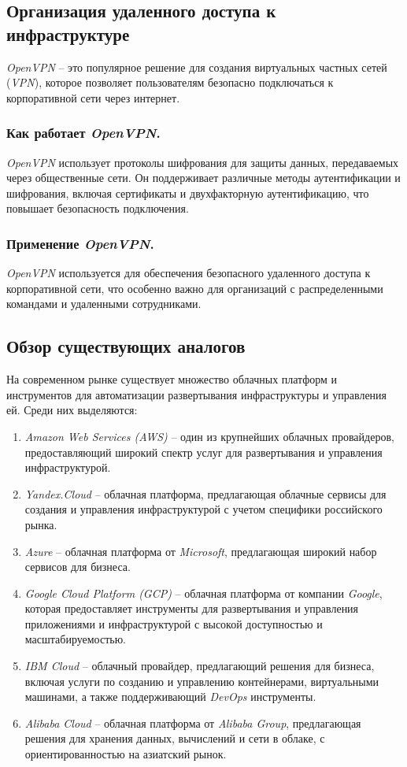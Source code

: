 \subsection{Организация удаленного доступа к инфраструктуре}
\label{sec:vpn}
\textit{OpenVPN} -- это популярное решение для создания виртуальных частных сетей (\textit{VPN}), которое позволяет пользователям безопасно подключаться к корпоративной сети через интернет.

\subsubsection{Как работает \textit{OpenVPN}.}
\textit{OpenVPN} использует протоколы шифрования для защиты данных, передаваемых через общественные сети. Он поддерживает различные методы аутентификации и шифрования, включая сертификаты и двухфакторную аутентификацию, что повышает безопасность подключения.

\subsubsection{Применение \textit{OpenVPN}.}
\textit{OpenVPN} используется для обеспечения безопасного удаленного доступа к корпоративной сети, что особенно важно для организаций с распределенными командами и удаленными сотрудниками.

\subsection{Обзор существующих аналогов}
\label{sec:existing_analogs}
На современном рынке существует множество облачных платформ и инструментов для автоматизации развертывания инфраструктуры и управления ей. Среди них выделяются:
\begin{enumerate}
    \item \textit{Amazon Web Services (AWS)} -- один из крупнейших облачных провайдеров, предоставляющий широкий спектр услуг для развертывания и управления инфраструктурой.
    \item \textit{Yandex.Cloud} -- облачная платформа, предлагающая облачные сервисы для создания и управления инфраструктурой с учетом специфики российского рынка.
    \item \textit{Azure} -- облачная платформа от \textit{Microsoft}, предлагающая широкий набор сервисов для бизнеса.
    \item \textit{Google Cloud Platform (GCP)} -- облачная платформа от компании \textit{Google}, которая предоставляет инструменты для развертывания и управления приложениями и инфраструктурой с высокой доступностью и масштабируемостью.
    \item \textit{IBM Cloud} -- облачный провайдер, предлагающий решения для бизнеса, включая услуги по созданию и управлению контейнерами, виртуальными машинами, а также поддерживающий \textit{DevOps} инструменты.
    \item \textit{Alibaba Cloud} -- облачная платформа от \textit{Alibaba Group}, предлагающая решения для хранения данных, вычислений и сети в облаке, с ориентированностью на азиатский рынок.
\end{enumerate}

